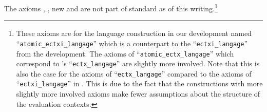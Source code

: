 \documentclass{article}
\begin{document}
The axioms ,
,  new and
are not part of standard \Iris{} as of this writing.\footnote{These
  axioms are for the language construction in our development named
  ``\texttt{atomic\_ectxi\_langage}'' which is a counterpart to the
  ``\texttt{ectxi\_langage}'' from the \Iris{} development. The axioms
  of ``\texttt{atomic\_ectx\_langage}'' which correspond to \Iris{}'s
  ``\texttt{ectx\_langage}'' are slightly more involved. Note that this
  is also the case for the axioms of ``\texttt{ectx\_langage}''
  compared to the axioms of ``\texttt{ectxi\_langage}'' in
  \Iris{}. This is due to the fact that the constructions with more
  slightly more involved axioms make fewer assumptions about the
  structure of the evaluation contexts.}
\end{document}
